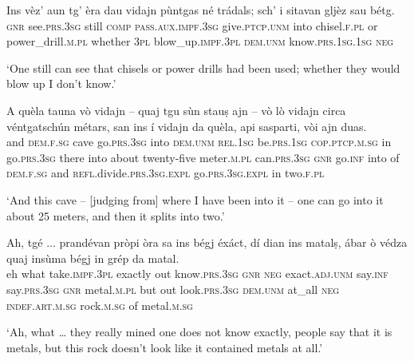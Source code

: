 \begin{linenumbers}
\gll Ins vèz’ aun tg’ èra dau vidajn pùntgas né trádals; sch’ i sitavan gljèz sau bétg.   \\
\textsc{gnr} see.\textsc{prs.3sg} still \textsc{comp} \textsc{pass.aux.impf.3sg} give.\textsc{ptcp.unm} into chisel.\textsc{f.pl} or power\_drill.\textsc{m.pl} whether \textsc{3pl} blow\_up.\textsc{impf.3pl} \textsc{dem.unm} know.\textsc{prs.1sg.1sg}  \textsc{neg}  \\
\end{linenumbers}
\medskip
\glt `One still can see that chisels or power drills had been used; whether they would blow up I don’t know.'
\medskip

\begin{linenumbers}
\gll A quèla tauna vò vidajn – quaj tgu sùn stauṣ ajn – vò lò vidajn circa véntgatschún métars, san ins í vidajn da quèla, api sasparti, vòi ajn duas.\\
and \textsc{dem.f.sg} cave go.\textsc{prs.3sg} into {}  \textsc{dem.unm} \textsc{rel.1sg} be.\textsc{prs.1sg} \textsc{cop.ptcp.m.sg} in {} go.\textsc{prs.3sg} there into about twenty-five meter.\textsc{m.pl} can.\textsc{prs.3sg} \textsc{gnr} go.\textsc{inf} into of \textsc{dem.f.sg} and \textsc{refl}.divide.\textsc{prs.3sg.expl} go.\textsc{prs.3sg.expl} in two.\textsc{f.pl}  \\
\end{linenumbers}
\medskip
\glt `And this cave – [judging from] where I have been into it – one can go into it about 25 meters, and then it splits into two.'
\medskip

\begin{linenumbers}
\gll   Ah, tgé ... prandévan pròpi òra sa ins bégj éxáct, dí dian ins matalṣ, ábar ò védza quaj insùma bégj in grép da matal. \\
eh what {} take.\textsc{impf.3pl} exactly out know.\textsc{prs.3sg} \textsc{gnr} \textsc{neg} exact.\textsc{adj.unm} say.\textsc{inf} say.\textsc{prs.3sg} \textsc{gnr}  metal.\textsc{m.pl} but out look.\textsc{prs.3sg} \textsc{dem.unm} at\_all \textsc{neg} \textsc{indef.art.m.sg} rock.\textsc{m.sg} of metal.\textsc{m.sg}\\
\end{linenumbers}
\medskip
\glt `Ah, what … they really mined one does not know exactly, people say that it is metals, but this rock doesn't look like it contained metals at all.'
\medskip

